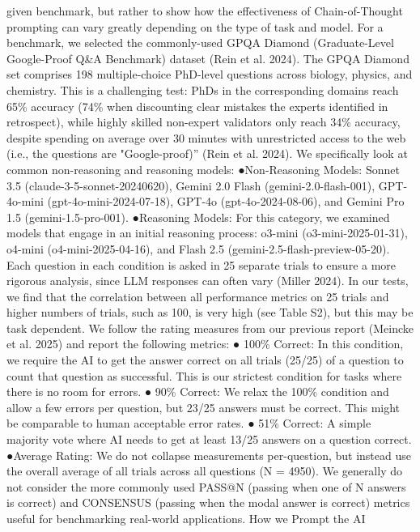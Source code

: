 given benchmark, but rather to show how the effectiveness of Chain-of-Thought prompting can
vary greatly depending on the type of task and model.
For a benchmark, we selected the commonly-used GPQA Diamond (Graduate-Level
Google-Proof Q\&A Benchmark) dataset (Rein et al. 2024). The GPQA Diamond set comprises
198 multiple-choice PhD-level questions across biology, physics, and chemistry. This is a
challenging test: PhDs in the corresponding domains reach 65\% accuracy (74\% when
discounting clear mistakes the experts identified in retrospect), while highly skilled non-expert
validators only reach 34\% accuracy, despite spending on average over 30 minutes with
unrestricted access to the web (i.e., the questions are "Google-proof)” (Rein et al. 2024).
We specifically look at common non-reasoning and reasoning models:
●​ Non-Reasoning Models: Sonnet 3.5 (claude-3-5-sonnet-20240620), Gemini 2.0 Flash
(gemini-2.0-flash-001), GPT-4o-mini (gpt-4o-mini-2024-07-18), GPT-4o
(gpt-4o-2024-08-06), and Gemini Pro 1.5 (gemini-1.5-pro-001).
●​ Reasoning Models: For this category, we examined models that engage in an initial
reasoning process: o3-mini (o3-mini-2025-01-31), o4-mini (o4-mini-2025-04-16), and
Flash 2.5 (gemini-2.5-flash-preview-05-20).
Each question in each condition is asked in 25 separate trials to ensure a more rigorous
analysis, since LLM responses can often vary (Miller 2024). In our tests, we find that the
correlation between all performance metrics on 25 trials and higher numbers of trials, such as
100, is very high (see Table S2), but this may be task dependent. We follow the rating measures
from our previous report (Meincke et al. 2025) and report the following metrics:
●​ 100\% Correct: In this condition, we require the AI to get the answer correct on all trials
(25/25) of a question to count that question as successful. This is our strictest condition
for tasks where there is no room for errors.
●​ 90\% Correct: We relax the 100\% condition and allow a few errors per question, but
23/25 answers must be correct. This might be comparable to human acceptable error
rates.
●​ 51\% Correct: A simple majority vote where AI needs to get at least 13/25 answers on a
question correct.
●​ Average Rating: We do not collapse measurements per-question, but instead use the
overall average of all trials across all questions (N = 4950).
We generally do not consider the more commonly used PASS@N (passing when one of N
answers is correct) and CONSENSUS (passing when the modal answer is correct) metrics
useful for benchmarking real-world applications.
How we Prompt the AI
